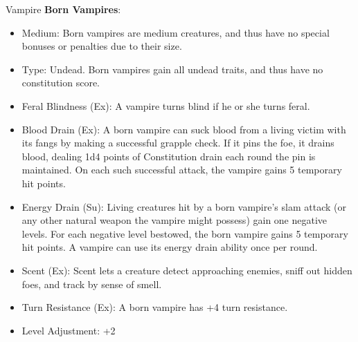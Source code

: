 \begin{35e}{Vampire}
  \textbf{Born Vampires}:\\
  \begin{itemize}[noitemsep]
    \item Medium: Born vampires are medium creatures, and thus have no special
      bonuses or penalties due to their size.
    \item Type: Undead. Born vampires gain all undead traits, and thus have no
      constitution score.
    \item Feral Blindness (Ex): A vampire turns blind if he or she turns feral.
    \item Blood Drain (Ex): A born vampire can suck blood from a living victim
      with its fangs by making a successful grapple check. If it pins the foe,
      it drains blood, dealing 1d4 points of Constitution drain each round the
      pin is maintained. On each such successful attack, the vampire gains 5
      temporary hit points.
    \item Energy Drain (Su): Living creatures hit by a born vampire's slam
      attack (or any other natural weapon the vampire might possess) gain one
      negative levels. For each negative level bestowed, the born vampire
      gains 5 temporary hit points. A vampire can use its energy drain ability
      once per round.
    \item Scent (Ex): Scent lets a creature detect approaching enemies, sniff
      out hidden foes, and track by sense of smell.
    \item Turn Resistance (Ex): A born vampire has +4 turn resistance.
    \item Level Adjustment: +2
  \end{itemize}
\end{35e}
